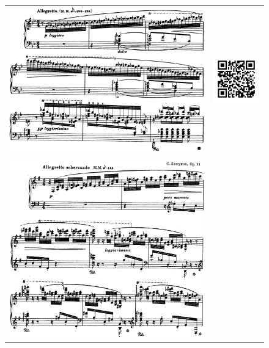 \begin{figure}[!p]
  \begin{bigcenter}
    \begin{tabular}{lr}
      \vspace*{0.0cm}
      \includegraphics[width=12.5cm, keepaspectratio]{feux-follets.png}
      &
      \includegraphics[width=3cm, keepaspectratio]{feux-follets-qr.png}
      \\
      \vspace{0.5cm} &
      \\
      \includegraphics[width=12.5cm, keepaspectratio]{op11-xi.png}

\end{tabular}
\end{bigcenter}
\end{figure}
